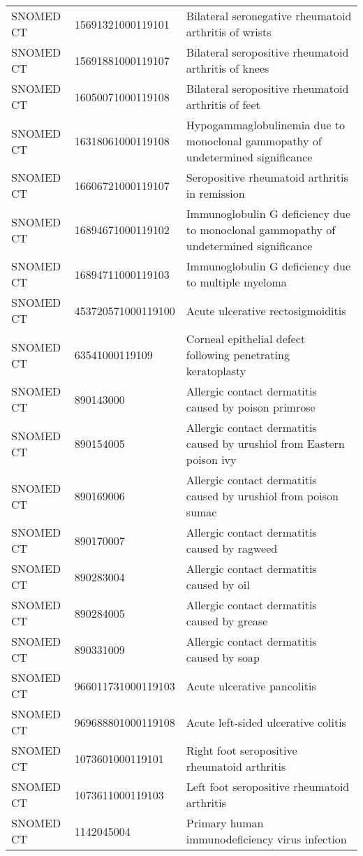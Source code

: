 \begin{longtable}{p{}p{}p{}}
  SNOMED CT & 15691321000119101 & Bilateral seronegative rheumatoid arthritis of wrists \\ 
  SNOMED CT & 15691881000119107 & Bilateral seropositive rheumatoid arthritis of knees \\ 
  SNOMED CT & 16050071000119108 & Bilateral seropositive rheumatoid arthritis of feet \\ 
  SNOMED CT & 16318061000119108 & Hypogammaglobulinemia due to monoclonal gammopathy of undetermined significance \\ 
  SNOMED CT & 16606721000119107 & Seropositive rheumatoid arthritis in remission \\ 
  SNOMED CT & 16894671000119102 & Immunoglobulin G deficiency due to monoclonal gammopathy of undetermined significance \\ 
  SNOMED CT & 16894711000119103 & Immunoglobulin G deficiency due to multiple myeloma \\ 
  SNOMED CT & 453720571000119100 & Acute ulcerative rectosigmoiditis \\ 
  SNOMED CT & 63541000119109 & Corneal epithelial defect following penetrating keratoplasty \\ 
  SNOMED CT & 890143000 & Allergic contact dermatitis caused by poison primrose \\ 
  SNOMED CT & 890154005 & Allergic contact dermatitis caused by urushiol from Eastern poison ivy \\ 
  SNOMED CT & 890169006 & Allergic contact dermatitis caused by urushiol from poison sumac \\ 
  SNOMED CT & 890170007 & Allergic contact dermatitis caused by ragweed \\ 
  SNOMED CT & 890283004 & Allergic contact dermatitis caused by oil \\ 
  SNOMED CT & 890284005 & Allergic contact dermatitis caused by grease \\ 
  SNOMED CT & 890331009 & Allergic contact dermatitis caused by soap \\ 
  SNOMED CT & 966011731000119103 & Acute ulcerative pancolitis \\ 
  SNOMED CT & 969688801000119108 & Acute left-sided ulcerative colitis \\ 
  SNOMED CT & 1073601000119101 & Right foot seropositive rheumatoid arthritis \\ 
  SNOMED CT & 1073611000119103 & Left foot seropositive rheumatoid arthritis \\ 
  SNOMED CT & 1142045004 & Primary human immunodeficiency virus infection \\ 

\end{longtable}
